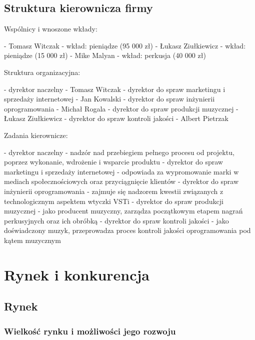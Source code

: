 \documentclass[12pt]{article}
\begin{document}
\subsection{Struktura kierownicza firmy}

Wspólnicy i wnoszone wkłady:

- Tomasz Witczak - wkład: pieniądze (95 000 zł)
- Łukasz Ziułkiewicz - wkład: pieniądze (15 000 zł)
- Mike Malyan - wkład: perkusja (40 000 zł)

Struktura organizacyjna:

- dyrektor naczelny - Tomasz Witczak
- dyrektor do spraw marketingu i sprzedaży internetowej - Jan Kowalski
- dyrektor do spraw inżynierii oprogramowania - Michał Rogala
- dyrektor do spraw produkcji muzycznej - Łukasz Ziułkiewicz
- dyrektor do spraw kontroli jakości - Albert Pietrzak

Zadania kierownicze:

- dyrektor naczelny - nadzór nad przebiegiem pełnego procesu od projektu,
  poprzez wykonanie, wdrożenie i wsparcie produktu
- dyrektor do spraw marketingu i sprzedaży internetowej - odpowiada za
  wypromowanie marki w mediach społecznościowych oraz przyciągnięcie klientów
- dyrektor do spraw inżynierii oprogramowania - zajmuje się nadzorem kwestii
  związanych z technologicznym aspektem wtyczki VSTi
- dyrektor do spraw produkcji muzycznej - jako producent muzyczny, zarządza
  początkowym etapem nagrań perkusyjnych oraz ich obróbką
- dyrektor do spraw kontroli jakości - jako doświadczony muzyk, przeprowadza
  proces kontroli jakości oprogramowania pod kątem muzycznym

\section{Rynek i konkurencja}

\subsection{Rynek}

\subsubsection{Wielkość rynku i możliwości jego rozwoju}

\end{document}

